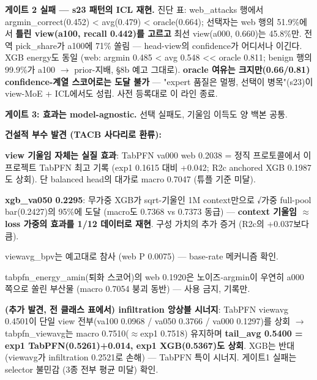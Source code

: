 \par\noindent \textbullet\enspace \textbf{게이트 2 실패 — s23 패턴의 ICL 재현.} 진단 표: web\_\allowbreak{}attacks 행에서 argmin\_\allowbreak{}correct(0.452) < avg(0.479) < oracle(0.664); 선택자는 web 행의 51.9\%에서 \textbf{틀린 view(a100, recall 0.442)를 고르고} 최선 view(a000, 0.660)는 45.8\%만. 전역 pick\_\allowbreak{}share가 a100에 71\% 쏠림 — head-view의 confidence가 어디서나 이긴다. XGB energy도 동일 (web: argmin 0.485 < avg 0.548 << oracle 0.811; benign 행의 99.9\%가 a100  \ensuremath{\rightarrow}  prior-지배, §8b 예고 그대로). \textbf{oracle 여유는 크지만(0.66/\allowbreak{}0.81) confidence-계열 스코어로는 도달 불가} — "expert 품질은 멀쩡, 선택이 병목"(s23)이 view-MoE +\allowbreak{} ICL에서도 성립. 사전 등록대로 이 라인 종료.


\par\noindent \textbullet\enspace \textbf{게이트 3: 효과는 model-agnostic.} 선택 실패도, 기울임 이득도 양 백본 공통.


\textbf{건설적 부수 발견 (TACB 사다리로 환류):}

\par\noindent \textbullet\enspace \textbf{view 기울임 자체는 실질 효과}: TabPFN va000 web 0.2038 =\allowbreak{} 정직 프로토콜에서 이 프로젝트 TabPFN 최고 기록 (exp1 0.1615 대비 +\allowbreak{}0.042; R2c anchored XGB 0.1987도 상회). 단 balanced head의 대가로 macro 0.7047 (튜플 기준 미달).


\par\noindent \textbullet\enspace \textbf{xgb\_\allowbreak{}va050 0.2295}: 무가중 XGB가 sqrt-기울인 1M context만으로 √가중 full-pool bar(0.2427)의 95\%에 도달 (macro도 0.7368 vs 0.7373 동급) — \textbf{context 기울임 \ensuremath{\approx} loss 가중의 효과를 1/\allowbreak{}12 데이터로 재현}. 구성 가치의 추가 증거 (R2c의 +\allowbreak{}0.037보다 큼).


\par\noindent \textbullet\enspace viewavg\_\allowbreak{}bpv는 예고대로 참사 (web P 0.0075) — base-rate 메커니즘 확인.


\par\noindent \textbullet\enspace tabpfn\_\allowbreak{}energy\_\allowbreak{}amin(퇴화 스코어)의 web 0.1920은 노이즈-argmin이 우연히 a000 쪽으로 쏠린 부산물 (macro 0.7054 붕괴 동반) — 사용 금지, 기록만.


\par\noindent \textbullet\enspace \textbf{(추가 발견, 전 클래스 표에서) infiltration 앙상블 시너지}: TabPFN viewavg 0.4501이 단일 view 전부(va100 0.0968 /\allowbreak{} va050 0.3766 /\allowbreak{} va000 0.1297)를 상회  \ensuremath{\rightarrow}  tabpfn\_\allowbreak{}viewavg는 macro 0.7510(\ensuremath{\approx}exp1 0.7518) 유지하며 \textbf{tail\_\allowbreak{}avg 0.5400 =\allowbreak{} exp1 TabPFN(0.5261)+\allowbreak{}0.014, exp1 XGB(0.5367)도 상회}. XGB는 반대(viewavg가 infiltration 0.2521로 손해) — TabPFN 특이 시너지. 게이트1 실패는 selector 불민감 (3종 전부 평균 미달) 확인.


